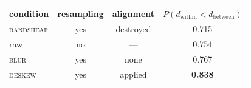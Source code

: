 \begin{tabular}{lccc}
\toprule
condition & resampling & alignment & $P(d_{\mathrm{within}} < d_{\mathrm{between}})$ \\
\midrule
\textsc{randshear} & yes & destroyed & 0.715 \\
raw & no & --- & 0.754 \\
\textsc{blur} & yes & none & 0.767 \\
\textsc{deskew} & yes & applied & \textbf{0.838} \\
\bottomrule
\end{tabular}
